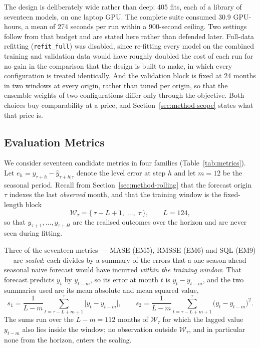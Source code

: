 \documentclass[12pt]{article}
\begin{document}
The design is deliberately wide rather than deep: 405 fits, each of a library of
seventeen models, on one laptop GPU. The complete suite consumed 30.9 GPU-hours,
a mean of 274 seconds per run within a 900-second ceiling. Two settings follow
from that budget and are stated here rather than defended later. Full-data
refitting (\texttt{refit\_full}) was disabled, since re-fitting every model on
the combined training and validation data would have roughly doubled the cost of
each run for no gain in the comparison that the design is built to make, in
which every configuration is treated identically. And the validation block is
fixed at 24 months in two windows at every origin, rather than tuned per origin,
so that the ensemble weights of two configurations differ only through the
objective. Both choices buy comparability at a price, and
Section~\ref{sec:method-scope} states what that price is.

\subsection{Evaluation Metrics}
\label{sec:method-metrics}

We consider seventeen candidate metrics in four families
(Table~\ref{tab:metrics}). Let $e_h = y_{\tau+h} - \hat{y}_{\tau+h|\tau}$ denote
the level error at step $h$ and let $m = 12$ be the seasonal period. Recall from
Section~\ref{sec:method-rolling} that the forecast origin $\tau$ indexes the last
\emph{observed} month, and that the training window is the fixed-length block
\begin{equation}
    \mathcal{W}_\tau = \{\,\tau - L + 1,\; \dots,\; \tau\,\}, \qquad L = 124 ,
\end{equation}
so that $y_{\tau+1}, \dots, y_{\tau+H}$ are the realised outcomes over the
horizon and are never seen during fitting.

Three of the seventeen metrics --- MASE (EM5), RMSSE (EM6) and SQL (EM9) --- are
\emph{scaled}: each divides by a summary of the errors that a one-season-ahead
seasonal naive forecast would have incurred \emph{within the training window}.
That forecast predicts $y_t$ by $y_{t-m}$, so its error at month $t$ is
$y_t - y_{t-m}$, and the two summaries used are its mean absolute and mean
squared value,
\begin{equation}
    s_1 = \frac{1}{L-m} \sum_{t=\tau-L+m+1}^{\tau} \big| y_t - y_{t-m} \big|,
    \qquad
    s_2 = \frac{1}{L-m} \sum_{t=\tau-L+m+1}^{\tau} \big( y_t - y_{t-m} \big)^2 .
    \label{eq:scaling}
\end{equation}
The sums run over the $L - m = 112$ months of $\mathcal{W}_\tau$ for which the
lagged value $y_{t-m}$ also lies inside the window; no observation outside
$\mathcal{W}_\tau$, and in particular none from the horizon, enters the scaling.
\end{document}
